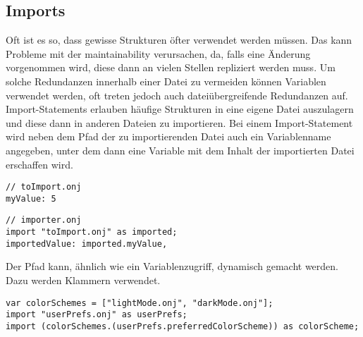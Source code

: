 
\subsection{Imports}\label{subsec:imports}

\renewcommand{\kapitelautor}{Autor: Marvin Kurka}

Oft ist es so, dass gewisse Strukturen öfter verwendet werden müssen.
Das kann Probleme mit der maintainability verursachen, da, falls eine Änderung vorgenommen wird, diese dann an vielen
Stellen repliziert werden muss.
Um solche Redundanzen innerhalb einer Datei zu vermeiden können Variablen verwendet werden, oft treten jedoch auch
dateiübergreifende Redundanzen auf.
Import-Statements erlauben häufige Strukturen in eine eigene Datei auszulagern und diese dann in anderen Dateien zu
importieren.
Bei einem Import-Statement wird neben dem Pfad der zu importierenden Datei auch ein Variablenname angegeben, unter dem
dann eine Variable mit dem Inhalt der importierten Datei erschaffen wird.

\begin{verbatim}
// toImport.onj
myValue: 5
\end{verbatim}

\begin{verbatim}
// importer.onj
import "toImport.onj" as imported;
importedValue: imported.myValue,
\end{verbatim}

Der Pfad kann, ähnlich wie ein Variablenzugriff, dynamisch gemacht werden.
Dazu werden Klammern verwendet.

\begin{verbatim}
var colorSchemes = ["lightMode.onj", "darkMode.onj"];
import "userPrefs.onj" as userPrefs;
import (colorSchemes.(userPrefs.preferredColorScheme)) as colorScheme;
\end{verbatim}

\renewcommand{\kapitelautor}{}
